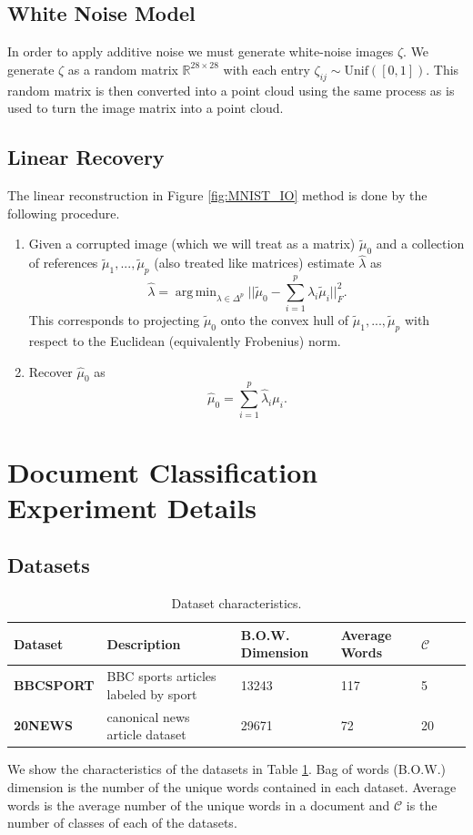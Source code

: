 \documentclass[nohyperref]{article}
\DeclareMathOperator*{\argmin}{arg\,min}
\theoremstyle{definition}
\begin{document}
\subsection{White Noise Model}

In order to apply additive noise we must generate white-noise images $\zeta$. We generate $\zeta$ as a random matrix $\mathbb{R}^{28\times 28}$ with each entry $\zeta_{ij} \sim \text{Unif}([0,1])$. This random matrix is then converted into a point cloud using the same process as is used to turn the image matrix into a point cloud.

\subsection{Linear Recovery} \label{sec:linear_rec}

The linear reconstruction in Figure \ref{fig:MNIST_IO} method is done by the following procedure.
\begin{enumerate}
    \item Given a corrupted image (which we will treat as a matrix) $\tilde{\mu}_0$ and a collection of references $\tilde{\mu}_1,...,\tilde{\mu}_p$ (also treated like matrices) estimate $\hat{\lambda}$ as
    $$\hat{\lambda} = \argmin_{\lambda \in \Delta^p} || \tilde{\mu}_0 - \sum_{i=1}^p \lambda_i \tilde{\mu}_i ||_F^2.$$
    This corresponds to projecting $\tilde{\mu}_0$ onto the convex hull of $\tilde{\mu}_1,...,\tilde{\mu}_p$ with respect to the Euclidean (equivalently Frobenius) norm.
    \item Recover $\hat{\mu}_0$ as
    $$\hat{\mu}_0 = \sum_{i=1}^p \hat{\lambda}_i \mu_i.$$
\end{enumerate}


\section{Document Classification Experiment Details} 

\subsection{Datasets} 

\begin{table}[h!]
\centering
{\begin{tabular}{l | llllll}
\hline
\textbf{Dataset} & Description & B.O.W. Dimension & Average Words & $\mathcal{C}$ \\
\hline
\textbf{BBCSPORT} &BBC sports articles labeled by sport & 13243 & 117 & 5 \\
\textbf{20NEWS} &canonical news article dataset & 29671 & 72 & 20 \\
\hline
\end{tabular}}
\caption{Dataset characteristics.}
\label{tab:accents}
\end{table}
We show the characteristics of the datasets in Table \ref{tab:accents}.  Bag of words (B.O.W.) dimension is the number of the unique words contained in each dataset. Average words is the average number of the unique words in a document and $\mathcal{C}$ is the number of classes of each of the datasets.
\end{document}
